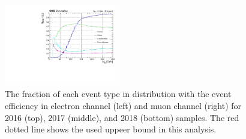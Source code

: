\begin{figure}[p]
    \includegraphics[width=0.45\textwidth]{figure/bbSep_18_mu_OptCut_chi2_20_bbSep.pdf}
    \caption[The fraction of each event type in \Mlb distribution.]
    {
        The fraction of each event type in \Mlb distribution with the event efficiency in electron channel (left) and muon channel (right) for 2016 (top), 2017 (middle), and 2018 (bottom) samples.
        The red dotted line shows the used uppeer bound in this analysis.
    }
    \label{fig:opt_cut}
\end{figure}

